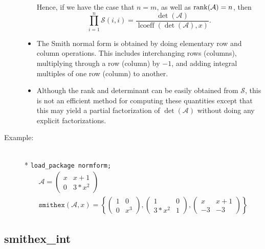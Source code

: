 \begin{description}
\begin{itemize}
      Hence, if we have the case that $n = m$, as well as 
      $\mathop{\mathrm{rank}}(\mathcal{A}) = n$, then 
      \begin{displaymath}
      \prod_{i=1}^{n} \mathcal{ S}(i,i) = 
      \frac{\det(\mathcal{A})} { \mathop{\mathrm{lcoeff}}(\det(\mathcal{A}),x)}.
      \end{displaymath}
      
\item The Smith normal form is obtained by doing elementary row and 
      column operations. This includes interchanging rows (columns),
      multiplying through a row (column) by $-1$, and adding integral 
      multiples of one row (column) to another.

\item Although the rank and determinant can be easily obtained from 
      $\mathcal{S}$, this is not an efficient method for computing these 
      quantities except that this may yield a partial factorization of 
      $\det(\mathcal{A})$ without doing any explicit factorizations.

\end{itemize}

\item[Example:]\mbox{}\\*
\texttt{load\_package normform;}
\begin{gather*}
 \mathcal{A} = \begin{pmatrix} x & x+1 \\ 0 & 3*x^2 \end{pmatrix} \\[2mm]
 \mathtt{smithex}(\mathcal{A}, x)  =  
  \left\{
    \begin{pmatrix} 1 & 0 \\ 0 & x^3 \end{pmatrix},
    \begin{pmatrix} 1 & 0 \\ 3*x^2 & 1 \end{pmatrix}, 
    \begin{pmatrix} x & x+1 \\ -3 & -3 \end{pmatrix} 
  \right\}
\end{gather*}
\end{description}

\subsection{smithex\_int}

